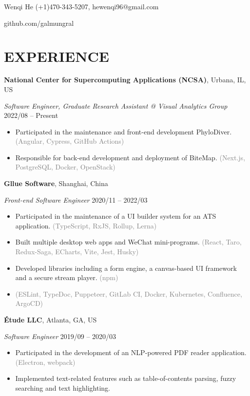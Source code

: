 \documentclass[10pt]{article}
\begin{document}
{\huge Wenqi He} \hfill (+1)470-343-5207, hewenqi96@gmail.com

\hfill github.com/galmungral

\section*{EXPERIENCE}
\textbf{National Center for Supercomputing Applications (NCSA)}, Urbana, IL, US

\textit{Software Engineer, Graduate Research Assistant @ Visual Analytics Group} \hfill 2022/08 -- Present

\begin{itemize}[itemsep=0pt, topsep=4pt, label=-]
\item Participated in the maintenance and front-end development PhyloDiver. \textcolor{gray}{(Angular, Cypress, GitHub Actions)}
\item Responsible for back-end development and deployment of BiteMap. \textcolor{gray}{(Next.js, PostgreSQL, Docker, OpenStack)}
\end{itemize}

\vspace{0.5em}
\textbf{Gllue Software}, Shanghai, China

\textit{Front-end Software Engineer}  \hfill 2020/11 -- 2022/03

\begin{itemize}[itemsep=0pt, topsep=4pt, label=-]
\item Participated in the maintenance of a UI builder system for an ATS application. \textcolor{gray}{(TypeScript, RxJS, Rollup, Lerna)}
\item Built multiple desktop web apps and WeChat mini-programs. \textcolor{gray}{(React, Taro, Redux-Saga, ECharts, Vite, Jest, Husky)}
\item Developed libraries including a form engine, a canvas-based UI framework and a secure stream player. \textcolor{gray}{(npm)}
\item \textcolor{gray}{(ESLint, TypeDoc, Puppeteer, GitLab CI, Docker, Kubernetes, Confluence, ArgoCD)}
\end{itemize}
\vspace{0.5em}
\textbf{Étude LLC}, Atlanta, GA, US

\textit{Software Engineer} \hfill 2019/09 -- 2020/03

\begin{itemize}[itemsep=0pt, topsep=4pt, label=-]
\item Participated in the development of an NLP-powered PDF reader application. \textcolor{gray}{(Electron, webpack)}
\item Implemented text-related features such as table-of-contents parsing, fuzzy searching and text highlighting.
\end{itemize}
\end{document}
